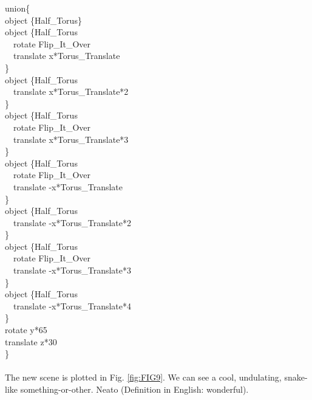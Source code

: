 \documentclass[fleqn,10pt]{wlscirep}
\newcommand*{\DF}{Definition in English}
\begin{document}
{\color{blue}
union\{ \\
object \{Half\_Torus\}  \\
object \{Half\_Torus  \\
\ \ rotate Flip\_It\_Over \\
\ \ translate x*Torus\_Translate  \\
\} \\
object \{Half\_Torus  \\
\ \ translate x*Torus\_Translate*2  \\
\}  \\
object \{Half\_Torus  \\
\ \ rotate Flip\_It\_Over  \\
\ \ translate x*Torus\_Translate*3  \\
\}  \\
object \{Half\_Torus  \\
\ \ rotate Flip\_It\_Over  \\
\ \ translate -x*Torus\_Translate  \\
\}  \\
object \{Half\_Torus  \\
\ \ translate -x*Torus\_Translate*2  \\
\}  \\
object \{Half\_Torus  \\
\ \ rotate Flip\_It\_Over  \\  
\ \ translate -x*Torus\_Translate*3 \\
\} \\
object \{Half\_Torus  \\
\ \ translate -x*Torus\_Translate*4  \\
\} \\
rotate y*65  \\
translate z*30  \\
\}  \\
}\\
The new scene is plotted in Fig. \ref{fig:FIG9}. We can see a cool, undulating, snake-like something-or-other. Neato (\DF: wonderful).
\end{document}
